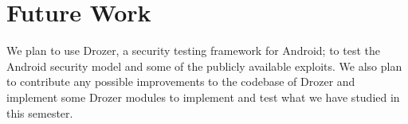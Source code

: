 \chapter{Future Work}

We plan to use Drozer, a security testing framework for Android; to test the Android security model and some of the publicly available exploits. We also plan to contribute any possible improvements to the codebase of Drozer and implement some Drozer modules to implement and test what we have studied in this semester.

